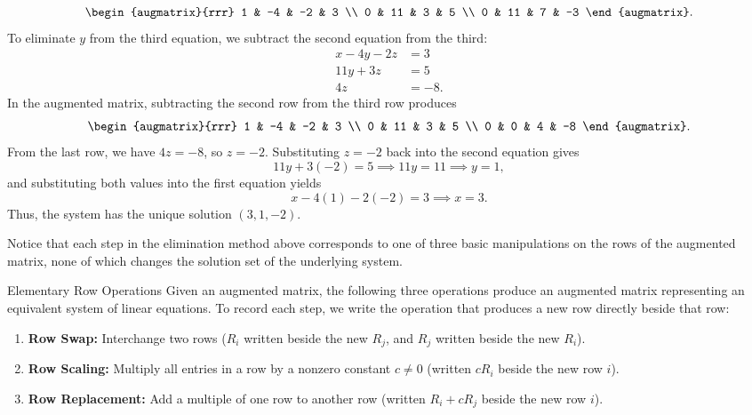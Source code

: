 \documentclass{article}
\begin{document}
\begin{example}
\[\begin{augmatrix}{rrr}
1 & -4 & -2 & 3 \\
0 & 11 & 3 & 5 \\
0 & 11 & 7 & -3
\end{augmatrix}.
\]
To eliminate \(y\) from the third equation, we subtract the second equation from the third:
\begin{align*}
x - 4y - 2z &= 3 \\
11y + 3z &= 5 \\
4z &= -8.
\end{align*}
In the augmented matrix, subtracting the second row from the third row produces
\[
\begin{augmatrix}{rrr}
1 & -4 & -2 & 3 \\
0 & 11 & 3 & 5 \\
0 & 0 & 4 & -8
\end{augmatrix}.
\]
From the last row, we have \(4z = -8\), so \(z = -2\). Substituting \(z = -2\) back into the second equation gives
\[
11y + 3(-2) = 5 \implies 11y = 11 \implies y = 1,
\]
and substituting both values into the first equation yields
\[
x - 4(1) - 2(-2) = 3 \implies x = 3.
\]
Thus, the system has the unique solution \((3, 1, -2)\).
\end{example}

Notice that each step in the elimination method above corresponds to one of three basic manipulations on the rows of the augmented matrix, none of which changes the solution set of the underlying system.

\begin{calloutbox}{Elementary Row Operations}
Given an augmented matrix, the following three operations produce an augmented matrix representing an equivalent system of linear equations. To record each step, we write the operation that produces a new row directly beside that row:
\begin{enumerate}
    \item \textbf{Row Swap:} Interchange two rows (\(R_i\) written beside the new \(R_j\), and \(R_j\) written beside the new \(R_i\)).
    \item \textbf{Row Scaling:} Multiply all entries in a row by a nonzero constant \(c \neq 0\) (written \(cR_i\) beside the new row \(i\)).
    \item \textbf{Row Replacement:} Add a multiple of one row to another row (written \(R_i + cR_j\) beside the new row \(i\)).
\end{enumerate}
\end{calloutbox}
\end{document}
